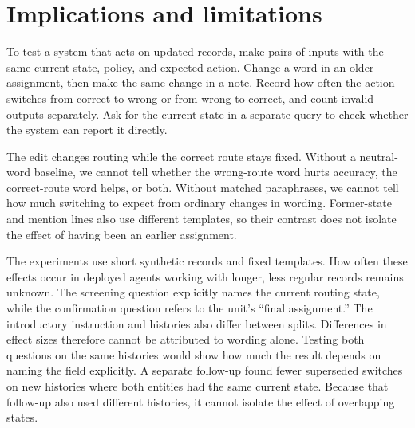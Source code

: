 \documentclass[letterpaper]{article}
\begin{document}
\section{Implications and limitations}
To test a system that acts on updated records, make pairs of inputs with the same current state, policy, and expected action. Change a word in an older assignment, then make the same change in a note. Record how often the action switches from correct to wrong or from wrong to correct, and count invalid outputs separately. Ask for the current state in a separate query to check whether the system can report it directly.

The edit changes routing while the correct route stays fixed. Without a neutral-word baseline, we cannot tell whether the wrong-route word hurts accuracy, the correct-route word helps, or both. Without matched paraphrases, we cannot tell how much switching to expect from ordinary changes in wording. Former-state and mention lines also use different templates, so their contrast does not isolate the effect of having been an earlier assignment.

The experiments use short synthetic records and fixed templates. How often these effects occur in deployed agents working with longer, less regular records remains unknown. The screening question explicitly names the current routing state, while the confirmation question refers to the unit's ``final assignment.'' The introductory instruction and histories also differ between splits. Differences in effect sizes therefore cannot be attributed to wording alone. Testing both questions on the same histories would show how much the result depends on naming the field explicitly. A separate follow-up found fewer superseded switches on new histories where both entities had the same current state. Because that follow-up also used different histories, it cannot isolate the effect of overlapping states.


\appendix

\end{document}
